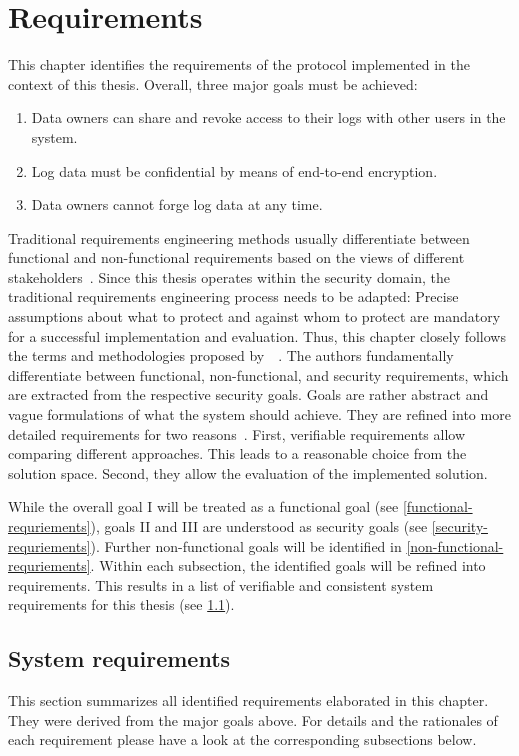 \documentclass[../main.tex]{subfiles}
\begin{document}
\chapter{Requirements}
\label{chap:requirements}

This chapter identifies the requirements of the protocol implemented in the context of this thesis.
Overall, three major goals must be achieved:

\begin{enumerate}[label=\Roman*.]
    \item Data owners can share and revoke access to their logs with other users in the system.
	\item Log data must be confidential by means of end-to-end encryption.
    \item Data owners cannot forge log data at any time.
\end{enumerate}

Traditional requirements engineering methods usually differentiate between functional and non-functional requirements based on the views of different stakeholders~\cite{Rehman2013}.
Since this thesis operates within the security domain, the traditional requirements engineering process needs to be adapted: 
Precise assumptions about what to protect and against whom to protect are mandatory for a successful implementation and evaluation.
Thus, this chapter closely follows the terms and methodologies proposed by~\citeauthor{Fabian2010}~\cite{Fabian2010}.
The authors fundamentally differentiate between functional, non-functional, and security requirements, which are extracted from the respective security goals.
Goals are rather abstract and vague formulations of what the system should achieve. 
They are refined into more detailed requirements for two reasons~\cite{Fabian2010}.
First, verifiable requirements allow comparing different approaches.
This leads to a reasonable choice from the solution space.
Second, they allow the evaluation of the implemented solution.

While the overall goal I will be treated as a functional goal (see \cref{functional-requriements}), goals II and III are understood as security goals (see \cref{security-requriements}).
Further non-functional goals will be identified in \cref{non-functional-requriements}.
Within each subsection, the identified goals will be refined into requirements.
This results in a list of verifiable and consistent system requirements for this thesis (see \cref{system-requriements}).


\section{System requirements}\label{system-requriements}
This section summarizes all identified requirements elaborated in this chapter.
They were derived from the major goals above.
For details and the rationales of each requirement please have a look at the corresponding subsections below.
\end{document}
